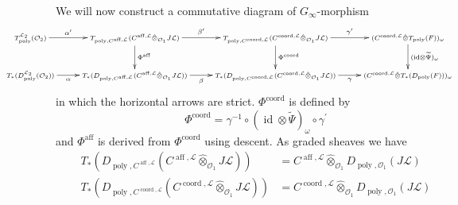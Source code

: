 \documentclass{amsart}
\numberwithin{equation}{section}
\let\cal\mathcal
\theoremstyle{definition}
\theoremstyle{remark}
\begin{document}
We will  now construct a commutative diagram of $G_\infty$-morphism
\begin{equation}
\label{ref-10.6-37}
\hspace*{-2cm}\xymatrix{
  \scriptstyle T_{\operatorname{poly}}^{{{\cal L}}_2}({{\cal O}}_2)\ar[r]^-{\alpha'} &
  \scriptstyle T_{{\operatorname{poly}},C^{{\operatorname{aff}},{{\cal L}}}}
(C^{{\operatorname{aff}},{{\cal L}}}{\mathbin{\hat{\otimes}}}_{{{\cal O}}_1} J{{\cal L}})\ar[r]^-{\beta'}
  \ar[d]^{\Phi^{\operatorname{aff}}} &
  \scriptstyle T_{{\operatorname{poly}},C^{{\operatorname{coord}},{{\cal L}}}}(C^{{\operatorname{coord}},{{\cal L}}}{\mathbin{\hat{\otimes}}}_{{{\cal O}}_1} J{{\cal L}}) 
  \ar[r]^-{\gamma'}\ar[d]^{\Phi^{\operatorname{coord}}}&
  \scriptstyle (C^{{\operatorname{coord}},{{\cal L}}}{\mathbin{\hat{\otimes}}} T_{\operatorname{poly}}(F))_{\omega}
  \ar[d]^{({\operatorname{id}}\otimes \widetilde{\Psi})_\omega}\\
  \scriptstyle T_\ast(D_{\operatorname{poly}}^{{{\cal L}}_2}({{\cal O}}_2))\ar[r]_-\alpha &
  \scriptstyle T_\ast(D_{{\operatorname{poly}},C^{{\operatorname{aff}},{{\cal L}}}}(C^{{\operatorname{aff}},{{\cal L}}}{\mathbin{\hat{\otimes}}}_{{{\cal O}}_1} J{{\cal L}}))\ar[r]_-\beta &
  \scriptstyle 
  T_\ast(D_{{\operatorname{poly}},C^{{\operatorname{coord}},{{\cal L}}}}(C^{{\operatorname{coord}},{{\cal L}}}{\mathbin{\hat{\otimes}}}_{{{\cal O}}_1} J{{\cal L}})) \ar[r]_-{\gamma}&
  \scriptstyle (C^{{\operatorname{coord}},{{\cal L}}} {\mathbin{\hat{\otimes}}} T_\ast(D_{\operatorname{poly}}(F)))_{\omega}
}
\end{equation}
in which the horizontal arrows are strict. $\Phi^{\operatorname{coord}}$ is defined by
\[
\Phi^{\operatorname{coord}}=\gamma^{-1}\circ ({\operatorname{id}}\otimes \widetilde{\Psi})_\omega\circ
\gamma^{\prime}
\] 
and $\Phi^{\operatorname{aff}}$ is derived from $\Phi^{\operatorname{coord}}$ using descent.  
As graded sheaves we have
\begin{align}
  T_\ast(D_{{\operatorname{poly}},C^{{\operatorname{aff}},{{\cal L}}}} (C^{{\operatorname{aff}},{{\cal L}}}{\mathbin{\hat{\otimes}}}_{{{\cal O}}_1} J{{\cal L}}))
&=C^{{\operatorname{aff}},{{\cal L}}} {\mathbin{\hat{\otimes}}}_{{{\cal O}}_1} D_{{\operatorname{poly}},{{\cal O}}_1}(J{{\cal L}})\\
\label{ref-10.8-38}  T_\ast(D_{{\operatorname{poly}},C^{{\operatorname{coord}},{{\cal L}}}} (C^{{\operatorname{coord}},{{\cal L}}}{\mathbin{\hat{\otimes}}}_{{{\cal O}}_1} J{{\cal L}}))
&=C^{{\operatorname{coord}},{{\cal L}}} {\mathbin{\hat{\otimes}}}_{{{\cal O}}_1} D_{{\operatorname{poly}},{{\cal O}}_1}(J{{\cal L}})
\end{align}
\end{document}
